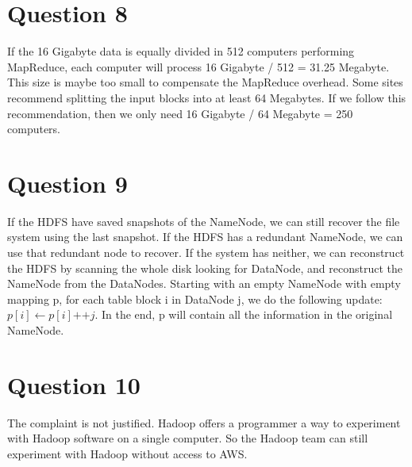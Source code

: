 \documentclass{article}
\begin{document}
\section{Question 8}
If the 16 Gigabyte data is equally divided in 512 computers performing MapReduce, each computer will process 16 Gigabyte / 512 = 31.25 Megabyte. This size is maybe too small to compensate the MapReduce overhead. Some sites recommend splitting the input blocks into at least 64 Megabytes. If we follow this recommendation, then we only need 16 Gigabyte / 64 Megabyte = 250 computers.


\section{Question 9}
If the HDFS have saved snapshots of the NameNode, we can still recover the file system using the last snapshot. If the HDFS has a redundant NameNode, we can use that redundant node to recover. If the system has neither, we can reconstruct the HDFS by scanning the whole disk looking for DataNode, and reconstruct the NameNode from the DataNodes. Starting with an empty NameNode with empty mapping p, for each table block i in DataNode j, we do the following update: $p[i] \leftarrow p[i] \textit{++} j$. In the end, p will contain all the information in the original NameNode.


\section{Question 10}
The complaint is not justified. Hadoop offers a programmer a way to experiment with Hadoop software on a single computer. So the Hadoop team can still experiment with Hadoop without access to AWS.
\end{document}
